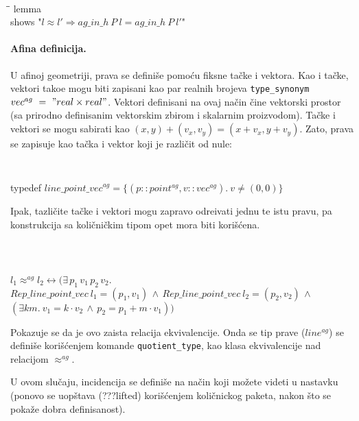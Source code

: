 \documentclass[a4paper, 12pt]{article}
\begin{document}
{\tt
\begin{tabbing}
\hspace{5mm}\=\hspace{5mm}\=\kill
lemma \\
\>shows "$l \approx l' \Longrightarrow ag\_in\_h\ P\ l = ag\_in\_h\ P\ l'$"
\end{tabbing}
}


\paragraph{Afina definicija.}
U afinoj geometriji, prava se defini\v se pomo\'cu fiksne ta\v cke i
vektora. Kao i ta\v cke, vektori tako\dj e mogu biti zapisani kao par
realnih brojeva {\tt type\_synonym\ $vec^{ag}\ =\ "real \times
  real"$}. Vektori definisani na ovaj na\v cin \v cine vektorski
prostor (sa prirodno definisanim vektorskim zbirom i skalarnim
proizvodom). Ta\v cke i vektori se mogu sabirati kao $(x, y) + (v_x,
v_y) = (x + v_x, y + v_y)$. Zato, prava se zapisuje kao ta\v cka i
vektor koji je razli\v cit od nule:

{\tt
\begin{tabbing}
typedef $\mathit{line\_point\_vec}^{ag} =\{(p::point^{ag}, v::vec^{ag}).\ v \neq (0, 0)\}$
\end{tabbing}
}

Ipak, tazli\v cite ta\v cke i vektori mogu zapravo odre\dj ivati jednu
te istu pravu, pa konstrukcija sa koli\v cni\v ckim tipom opet mora
biti kori\v s\'cena.

{\tt
\begin{tabbing}
\hspace{5mm}\=\\
$l_1 \approx^{ag} l_2 \longleftrightarrow (\exists\,p_1\,v_1\,p_2\,v_2.$\\
\>$\mathit{Rep\_line\_point\_vec}\ l_1 = (p_1, v_1) \,\wedge\,  \mathit{Rep\_line\_point\_vec}\ l_2 = (p_2, v_2) \,\wedge$\\
\>$(\exists k m.\ v_1 = k\cdot v_2 \,\wedge\, p_2 = p_1 + m\cdot v_1))$
\end{tabbing}
}
\noindent Pokazuje se da je ovo zaista relacija ekvivalencije. Onda se
tip prave ($\mathit{line^{ag}}$) se defini\v se kori\v s\'cenjem
komande \verb|quotient_type|, kao klasa ekvivalencije nad relacijom
$\approx^{ag}$.

U ovom slu\v caju, incidencija se defini\v se na na\v cin koji mo\v
zete videti u nastavku (ponovo se uop\v stava (???{\lat lifted})
kori\v s\'cenjem koli\v cnickog paketa, nakon \v sto se poka\v ze
dobra definisanost).
\end{document}
